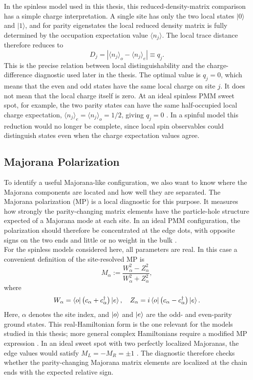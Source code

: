 In the spinless model used in this thesis, this reduced-density-matrix comparison has a simple charge interpretation. A single site has only the two local states $|0\rangle$ and $|1\rangle$, and for parity eigenstates the local reduced density matrix is fully determined by the occupation expectation value $\langle n_j\rangle$. The local trace distance therefore reduces to
\[
D_j =
\left|
\langle n_j\rangle_o-\langle n_j\rangle_e
\right|
\equiv q_j .
\]
This is the precise relation between local distinguishability and the charge-difference diagnostic used later in the thesis. The optimal value is $q_j=0$, which means that the even and odd states have the same local charge on site $j$. It does not mean that the local charge itself is zero. At an ideal spinless PMM sweet spot, for example, the two parity states can have the same half-occupied local charge expectation, $\langle n_j\rangle_e=\langle n_j\rangle_o=1/2$, giving $q_j=0$ \cite{leijnseParityQubitsPoor2012,dvirRealizationMinimalKitaev2023}. In a spinful model this reduction would no longer be complete, since local spin observables could distinguish states even when the charge expectation values agree.\\

\subsection{Majorana Polarization\newline}
\label{sec:theory-majorana-polarization}
To identify a useful Majorana-like configuration, we also want to know where the Majorana components are located and how well they are separated. The Majorana polarization (MP) is a local diagnostic for this purpose. It measures how strongly the parity-changing matrix elements have the particle-hole structure expected of a Majorana mode at each site. In an ideal PMM configuration, the polarization should therefore be concentrated at the edge dots, with opposite signs on the two ends and little or no weight in the bulk \cite{svenssonQuantumDotBased2024}.
\\

For the spinless models considered here, all parameters are real. In this case a convenient definition of the site-resolved MP is
\[
M_\alpha := \frac{W_\alpha^2 - Z_\alpha^2}{W_\alpha^2 + Z_\alpha^2},
\]
where
\[
W_\alpha = \bra{o}\left(c_{\alpha} + c_{\alpha}^{\dagger}\right)\ket{e},
\quad
Z_\alpha = i \bra{o}\left(c_{\alpha} - c_{\alpha}^{\dagger}\right)\ket{e}.
\]
Here, $\alpha$ denotes the site index, and $\ket{o}$ and $\ket{e}$ are the odd- and even-parity ground states. This real-Hamiltonian form is the one relevant for the models studied in this thesis; more general complex Hamiltonians require a modified MP expression \cite{samuelsonMinimalQuantumDot2023}. In an ideal sweet spot with two perfectly localized Majoranas, the edge values would satisfy $M_L=-M_R=\pm 1$ \cite{aguadoNewTrendsPlatforms2024}. The diagnostic therefore checks whether the parity-changing Majorana matrix elements are localized at the chain ends with the expected relative sign.\\

